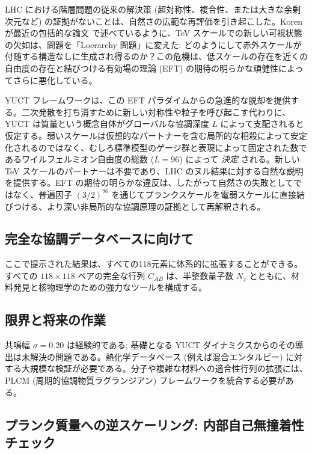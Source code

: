 \documentclass[11pt,a4paper]{article}
\theoremstyle{remark}
\begin{document}
	LHC における階層問題の従来の解決策 (超対称性、複合性、または大きな余剰次元など) の証拠がないことは、自然さの広範な再評価を引き起こした。Koren が最近の包括的な論文 \cite{Koren2020} で述べているように、TeV スケールでの新しい可視状態の欠如は、問題を「Loerarchy 問題」に変えた: どのようにして赤外スケールが付随する構造なしに生成され得るのか？この危機は、低スケールの存在を近くの自由度の存在と結びつける有効場の理論 (EFT) の期待の明らかな頑健性によってさらに悪化している。
	
	YUCT フレームワークは、この EFT パラダイムからの急進的な脱却を提供する。二次発散を打ち消すために新しい対称性や粒子を呼び起こす代わりに、YUCT は質量という概念自体がグローバルな協調深度 \(L\) によって支配されると仮定する。弱いスケールは仮想的なパートナーを含む局所的な相殺によって安定化されるのではなく、むしろ標準模型のゲージ群と表現によって固定された数であるワイルフェルミオン自由度の総数 (\(L=96\)) によって \emph{決定} される。新しい TeV スケールのパートナーは不要であり、LHC のヌル結果に対する自然な説明を提供する。EFT の期待の明らかな違反は、したがって自然さの失敗としてではなく、普遍因子 \((3/2)^{96}\) を通じてプランクスケールを電弱スケールに直接結びつける、より深い非局所的な協調原理の証拠として再解釈される。
	
	\subsection{完全な協調データベースに向けて}
	
	ここで提示された結果は、すべての118元素に体系的に拡張することができる。すべての \(118\times 118\) ペアの完全な行列 \(C_{AB}\) は、半整数量子数 \(N_f\) とともに、材料発見と核物理学のための強力なツールを構成する。
	
	\subsection{限界と将来の作業}
	
	共鳴幅 \(\sigma = 0.20\) は経験的である; 基礎となる YUCT ダイナミクスからのその導出は未解決の問題である。熱化学データベース (例えば混合エンタルピー) に対する大規模な検証が必要である。分子や複雑な材料への適合性行列の拡張には、PLCM (周期的協調物質ラグランジアン) フレームワークを統合する必要がある。
	
	\subsection{プランク質量への逆スケーリング: 内部自己無撞着性チェック}
	\label{subsec:reverse}
	
\end{document}
